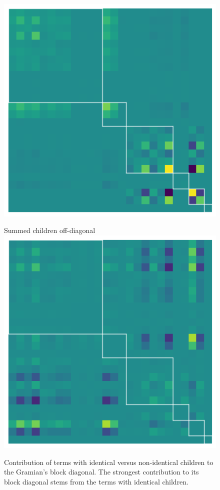 \begin{figure}
\begin{minipage}[t]{0.22\linewidth}
    \includegraphics[width=\linewidth]{../kfac_pinns_exp/exp04_gramian_contributions/fig/gram_diag_children.png}
  \end{minipage}
  \hfill
  \begin{minipage}[t]{0.22\linewidth}
    \centering
    Summed children off-diagonal
    \includegraphics[width=\linewidth]{../kfac_pinns_exp/exp04_gramian_contributions/fig/gram_offdiag_children.png}
  \end{minipage}
  \caption{Contribution of terms with identical versus non-identical children to the Gramian's block diagonal.
    The strongest contribution to its block diagonal stems from the terms with identical children.}\label{fig:gramian-contribution-summed-children}
\end{figure}
